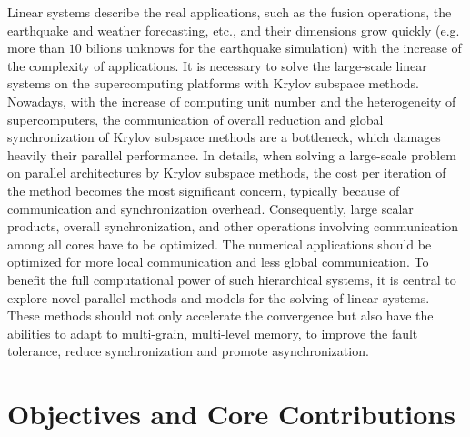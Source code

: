 Linear systems describe the real applications, such as the fusion operations, the earthquake and weather forecasting, etc., and their dimensions grow quickly (e.g. more than $10$ bilions unknows for the earthquake simulation) with the increase of the complexity of applications. It is necessary to solve the large-scale linear systems on the supercomputing platforms with Krylov subspace methods. Nowadays, with the increase of computing unit number and the heterogeneity of supercomputers, the communication of overall reduction and global synchronization of Krylov subspace methods are a bottleneck, which damages heavily their parallel performance. In details, when solving a large-scale problem on parallel architectures by Krylov subspace methods, the cost per iteration of the method becomes the most significant concern, typically because of communication and synchronization overhead. Consequently, large scalar products, overall synchronization, and other operations involving communication among all cores have to be optimized. The numerical applications should be optimized for more local communication and less global communication. To benefit the full computational power of such hierarchical systems, it is central to explore novel parallel methods and models for the solving of linear systems. These methods should not only accelerate the convergence but also have the abilities to adapt to multi-grain, multi-level memory, to improve the fault tolerance, reduce synchronization and promote asynchronization.

\section{Objectives and Core Contributions}

